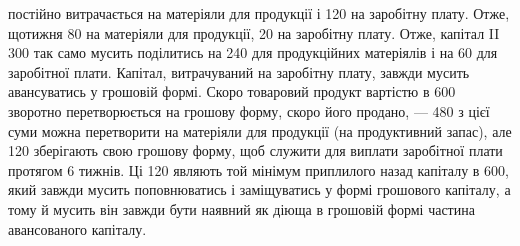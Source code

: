\parcont{}  %
постійно витрачається на матеріяли для продукції і  \deq{} 120
на заробітну плату. Отже, щотижня 80 на матеріяли для продукції,
20 на заробітну плату. Отже, капітал II \deq{} 300
так само мусить поділитись на  \deq{} 240 для продукційних матеріялів
і на  \deq{} 60 для заробітної плати. Капітал, витрачуваний
на заробітну плату, завжди мусить авансуватись у грошовій формі.
Скоро товаровий продукт вартістю в 600 зворотно перетворюється
на грошову форму, скоро його продано, — 480 з цієї
суми можна перетворити на матеріяли для продукції (на продуктивний
запас), але 120 зберігають свою грошову форму, щоб служити
для виплати заробітної плати протягом 6 тижнів. Ці 120 являють
той мінімум приплилого назад капіталу в 600, який завжди
мусить поповнюватись і заміщуватись у формі грошового капіталу, а
тому й мусить він завжди бути наявний як діюща в грошовій формі частина
авансованого капіталу.

